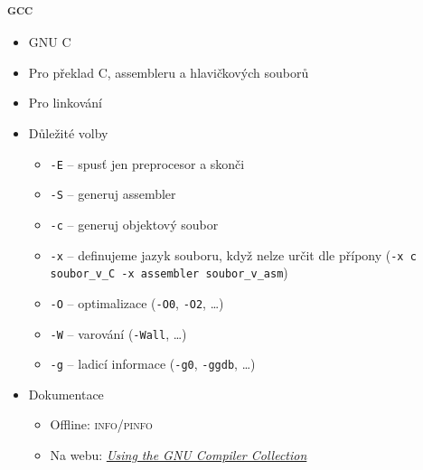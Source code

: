 \begin{frame}
  \frametitle{\textsc{gcc}}

  \begin{itemize}
    \item GNU C

    \pause

    \item Pro překlad C, assembleru a hlavičkových souborů

    \pause

    \item Pro linkování

    \pause

    \item Důležité volby
    \begin{itemize}
      \item \texttt{-E} -- spusť jen preprocesor a skonči
      \item \texttt{-S} -- generuj assembler
      \item \texttt{-c} -- generuj objektový soubor
      \item \texttt{-x} -- definujeme jazyk souboru, když nelze určit dle
	přípony (\texttt{-x c soubor\_v\_C -x assembler soubor\_v\_asm})
      \item \texttt{-O} -- optimalizace (\texttt{-O0}, \texttt{-O2}, \dots)
      \item \texttt{-W} -- varování (\texttt{-Wall}, \dots)
      \item \texttt{-g} -- ladicí informace (\texttt{-g0}, \texttt{-ggdb},
        \dots)
    \end{itemize}

    \pause

    \item Dokumentace
    \begin{itemize}
      \item Offline: \textsc{info}/\textsc{pinfo}
      \item Na webu: \href{https://gcc.gnu.org/onlinedocs/}{\textit{Using the
	GNU Compiler Collection}}
    \end{itemize}
  \end{itemize}

\end{frame}

